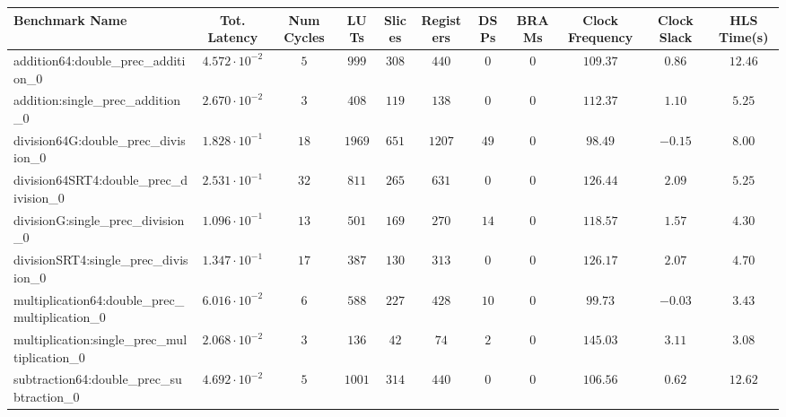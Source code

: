 \begin{tabular}{|l|c|c|c|c|c|c|c|c|c|c|}
\hline
Benchmark Name                                   & Tot. Latency            & Num Cycles & LUTs     & Slices   & Registers & DSPs   & BRAMs & Clock Frequency & Clock Slack & HLS Time(s) \\
\hline
addition64:double\_prec\_addition\_0             & $ 4.572 \cdot 10^{-2} $ & $ 5      $ & $ 999  $ & $ 308  $ & $ 440   $ & $ 0  $ & $ 0 $ & $ 109.37      $ & $ 0.86    $ & $ 12.46   $ \\
addition:single\_prec\_addition\_0               & $ 2.670 \cdot 10^{-2} $ & $ 3      $ & $ 408  $ & $ 119  $ & $ 138   $ & $ 0  $ & $ 0 $ & $ 112.37      $ & $ 1.10    $ & $ 5.25    $ \\
division64G:double\_prec\_division\_0            & $ 1.828 \cdot 10^{-1} $ & $ 18     $ & $ 1969 $ & $ 651  $ & $ 1207  $ & $ 49 $ & $ 0 $ & $ 98.49       $ & $ -0.15   $ & $ 8.00    $ \\
division64SRT4:double\_prec\_division\_0         & $ 2.531 \cdot 10^{-1} $ & $ 32     $ & $ 811  $ & $ 265  $ & $ 631   $ & $ 0  $ & $ 0 $ & $ 126.44      $ & $ 2.09    $ & $ 5.25    $ \\
divisionG:single\_prec\_division\_0              & $ 1.096 \cdot 10^{-1} $ & $ 13     $ & $ 501  $ & $ 169  $ & $ 270   $ & $ 14 $ & $ 0 $ & $ 118.57      $ & $ 1.57    $ & $ 4.30    $ \\
divisionSRT4:single\_prec\_division\_0           & $ 1.347 \cdot 10^{-1} $ & $ 17     $ & $ 387  $ & $ 130  $ & $ 313   $ & $ 0  $ & $ 0 $ & $ 126.17      $ & $ 2.07    $ & $ 4.70    $ \\
multiplication64:double\_prec\_multiplication\_0 & $ 6.016 \cdot 10^{-2} $ & $ 6      $ & $ 588  $ & $ 227  $ & $ 428   $ & $ 10 $ & $ 0 $ & $ 99.73       $ & $ -0.03   $ & $ 3.43    $ \\
multiplication:single\_prec\_multiplication\_0   & $ 2.068 \cdot 10^{-2} $ & $ 3      $ & $ 136  $ & $ 42   $ & $ 74    $ & $ 2  $ & $ 0 $ & $ 145.03      $ & $ 3.11    $ & $ 3.08    $ \\
subtraction64:double\_prec\_subtraction\_0       & $ 4.692 \cdot 10^{-2} $ & $ 5      $ & $ 1001 $ & $ 314  $ & $ 440   $ & $ 0  $ & $ 0 $ & $ 106.56      $ & $ 0.62    $ & $ 12.62   $ \\

\end{tabular}
